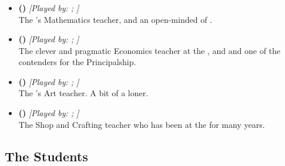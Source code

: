 \documentclass[blue]{GL2020}
\begin{document}
\subsubsection*{\pShip{}}
\begin{itemize}
    \item \textbf{\cFlowPriest{\full} (\cFlowPriest{\MYcharpronouns})} \textit{[Played by: \cFlowPriest{\MYplayer}; \cFlowPriest{\MYplayerpronouns}]}\\ The \pSc{}'s Mathematics teacher, and an open-minded \cFlowPriest{\cleric} of \cFlow{}.
    
    \item \textbf{\cChupSecond{\full} (\cChupSecond{\MYcharpronouns})} \textit{[Played by: \cChupSecond{\MYplayer}; \cChupSecond{\MYplayerpronouns}]}\\ The clever and pragmatic Economics teacher at the \pSc{}, and and one of the contenders for the Principalship.
    
    \item \textbf{\cChupAvenger{\full} (\cChupAvenger{\MYcharpronouns})} \textit{[Played by: \cChupAvenger{\MYplayer}; \cChupAvenger{\MYplayerpronouns}]}\\ The \pSc{}'s Art teacher. A bit of a loner.
   		 
    \item \textbf{\cPirate{\full} (\cPirate{\MYcharpronouns})} \textit{[Played by: \cPirate{\MYplayer}; \cPirate{\MYplayerpronouns}]}\\ The Shop and Crafting teacher who has been at the \pSc{} for many years.
\end{itemize}

\subsection*{The Students}
\end{document}
